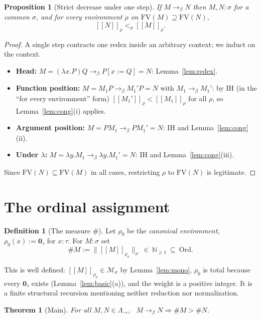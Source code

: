 \documentclass{amsart}
\newtheorem{theorem}{Theorem}
\newtheorem{proposition}{Proposition}
\theoremstyle{definition}
\newtheorem{definition}{Definition}
\newcommand{\Ord}{\mathrm{Ord}}
\newcommand{\interp}[1]{[\![#1]\!]}
\newcommand{\To}{\to_\beta}
\newcommand{\FV}{\mathrm{FV}}
\begin{document}
\begin{proposition}[Strict decrease under one step]\label{prop:step}
If $M\To N$ then $M,N:\sigma$ for a common $\sigma$, and for every environment $\rho$ on
$\FV(M)\supseteq\FV(N)$,
\[
  \interp{N}_\rho<_\sigma\interp{M}_\rho .
\]
\end{proposition}

\begin{proof}
A single step contracts one redex inside an arbitrary context; we induct on the context.
\begin{itemize}
\item \textbf{Head:} $M=(\lambda x.P)Q\To P[x:=Q]=N$: Lemma~\ref{lem:redex}.
\item \textbf{Function position:} $M=M_1P\To M_1'P=N$ with $M_1\To M_1'$: by IH (in the
  ``for every environment'' form) $\interp{M_1'}_\rho<\interp{M_1}_\rho$ for all $\rho$, so
  Lemma~\ref{lem:cong}(i) applies.
\item \textbf{Argument position:} $M=PM_1\To PM_1'=N$: IH and Lemma~\ref{lem:cong}(ii).
\item \textbf{Under $\lambda$:} $M=\lambda y.M_1\To\lambda y.M_1'=N$: IH and Lemma~\ref{lem:cong}(iii).
\end{itemize}
Since $\FV(N)\subseteq\FV(M)$ in all cases, restricting $\rho$ to $\FV(N)$ is legitimate.
\end{proof}

\section{The ordinal assignment}

\begin{definition}[The measure $\#$]\label{def:hash}
Let $\rho_0$ be the \emph{canonical environment}, $\rho_0(x):=\mathbf 0_\tau$ for $x:\tau$.
For $M:\sigma$ set
\[
  \#M := \bigl\|\interp{M}_{\rho_0}\bigr\|_\sigma\ \in\ \mathbb N_{\ge 1}\ \subseteq\ \Ord .
\]
\end{definition}

This is well defined: $\interp{M}_{\rho_0}\in\mathcal M_\sigma$ by Lemma~\ref{lem:mono},
$\rho_0$ is total because every $\mathbf 0_\tau$ exists (Lemma~\ref{lem:basic}(a)), and
the weight is a positive integer. It is a finite structural recursion mentioning neither
reduction nor normalization.

\begin{theorem}[Main]\label{thm:main}
For all $M,N\in\Lambda_\to$, \ $M\To N\Rightarrow\#M>\#N$.
\end{theorem}
\end{document}
